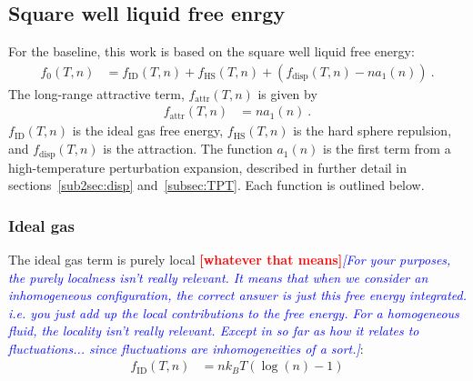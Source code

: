 \documentclass[letterpaper,twocolumn,amsmath,amssymb,prb]{revtex4-1}
\newcommand{\kT}{\ensuremath{k_BT}}
\newcommand{\fid}{\ensuremath{f_\text{ID}(T,n)}}
\newcommand{\fhs}{\ensuremath{f_\text{HS}(T,n)}}
\newcommand{\fdisp}{\ensuremath{f_\text{disp}(T,n)}}
\newcommand{\fattr}{\ensuremath{f_\text{attr}(T,n)}}
\newcommand{\1}{\ensuremath{\textbf{r}_1}}
\newcommand{\2}{\ensuremath{\textbf{r}_2}}
\newcommand{\3}{\ensuremath{\textbf{r}_3}}
\newcommand{\4}{\ensuremath{\textbf{r}_4}}
\newcommand{\fixme}[1]{\textcolor{red}{\textbf{[#1]}}}
\newcommand{\davidsays}[1]{\textcolor{blue}{\textit{[#1]}}}
\begin{document}
\subsection{Square well liquid free enrgy}\label{subsec:SW}
For the baseline, this work is based on the square well liquid free energy:\cite{Hughes13}
\begin{align}
  f_0(T,n) &= \fid + \fhs + \left( \fdisp - n a_1(n) \right) \ .
\end{align}
The long-range attractive term, $\fattr$ is given by
\begin{align}
  \fattr &= n a_1(n) \ .
\end{align}
$\fid$ is the ideal gas free energy, $\fhs$ is the hard sphere repulsion, and $\fdisp$ is the attraction. The function $a_1(n)$ is the first term from a high-temperature perturbation expansion, described in further detail in sections~\ref{sub2sec:disp} and~\ref{subsec:TPT}. Each function is outlined below.

\subsubsection{Ideal gas}\label{sub2sec:ID}
The ideal gas term is purely local \fixme{whatever that
  means}\davidsays{For your purposes, the purely localness isn't
  really relevant.  It means that when we consider an inhomogeneous
  configuration, the correct answer is just this free energy
  integrated.  i.e. you just add up the local contributions to the
  free energy.  For a homogeneous fluid, the locality isn't really
  relevant.  Except in so far as how it relates to
  fluctuations... since fluctuations are inhomogeneities of a sort.}:
\begin{align}
  \fid &= n\kT\left(\log(n) - 1\right)
\end{align}
\end{document}
